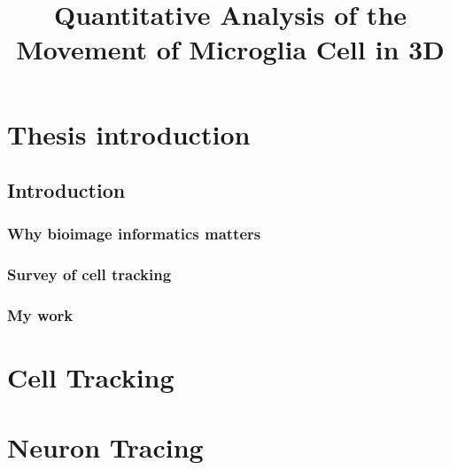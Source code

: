 \documentclass[b5,12pt]{report}
\title{Quantitative Analysis of the Movement of Microglia Cell in 3D}
\begin{document}
\maketitle
\abstract
\tableofcontents
\part{Thesis introduction}
\chapter{Introduction}
\section{Why bioimage informatics matters}
\section{Survey of cell tracking}
\section{My work}
\part{Cell Tracking}
\part{Neuron Tracing}




\end{document}
